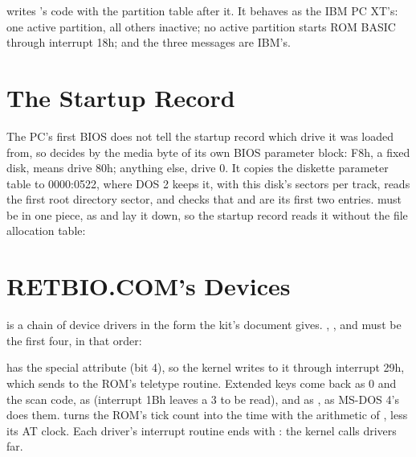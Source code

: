  writes 's code with the partition table
after it. It behaves as the IBM PC XT's: one active partition, all others
inactive; no active partition starts ROM BASIC through interrupt 18h; and
the three messages are IBM's.


\section{The Startup Record}

The PC's first BIOS does not tell the startup record which drive it was
loaded from, so  decides by the media byte of its own
BIOS parameter block: F8h, a fixed disk, means drive 80h; anything else,
drive 0. It copies the diskette parameter table to 0000:0522, where DOS 2
keeps it, with this disk's sectors per track, reads the first root
directory sector, and checks that  and 
are its first two entries.  must be in one piece, as
 and  lay it down, so the startup record
reads it without the file allocation table:



\section{RETBIO.COM's Devices}

 is a chain of device drivers in the form the kit's
 document gives. , ,  and
 must be the first four, in that order:


 has the special attribute (bit 4), so the kernel writes to it
through interrupt 29h, which  sends to the ROM's
teletype routine. Extended keys come back as 0 and the scan code,
 as  (interrupt 1Bh leaves a 3 to be
read), and  as , as MS-DOS 4's
 does them.  turns the ROM's tick count into
the time with the arithmetic of , less its AT clock.
Each driver's interrupt routine ends with : the kernel calls
drivers far.

